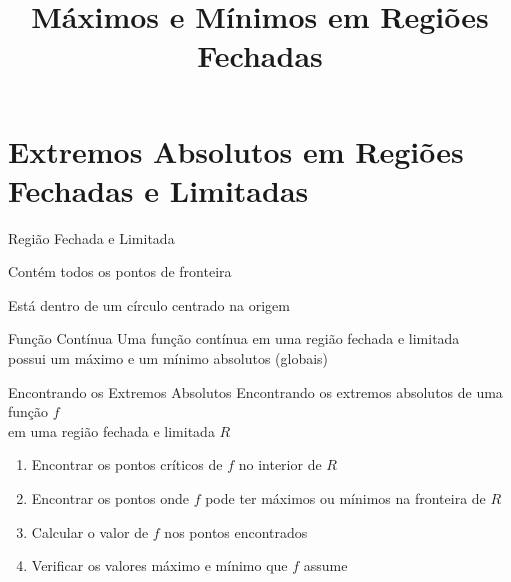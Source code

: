 
\usepackage{calculo_varias_variaveis-1}

\title{Máximos e Mínimos em Regiões Fechadas}



\addtitle

\section{Extremos Absolutos em Regiões Fechadas e Limitadas}

\begin{frame}{Região Fechada e Limitada}
  \begin{description}[<+->]
    \item[Fechada] Contém todos os pontos de fronteira \\[5mm]
    \item[Limitada] Está dentro de um círculo centrado na origem
  \end{description}
\end{frame}

\begin{frame}{Função Contínua}
  Uma função contínua em uma região fechada e limitada\\
  possui um máximo e um mínimo absolutos (globais)
\end{frame}

\begin{frame}{Encontrando os Extremos Absolutos}
  Encontrando os extremos absolutos de uma função $f$ \\
  em uma região fechada e limitada $R$
  \pause
  \begin{enumerate}[<+->]
    \item Encontrar os pontos críticos de $f$ no interior de $R$
    \item Encontrar os pontos onde $f$ pode ter máximos ou mínimos na fronteira de $R$
    \item Calcular o valor de $f$ nos pontos encontrados
    \item Verificar os valores máximo e mínimo que $f$ assume
  \end{enumerate}
\end{frame}


